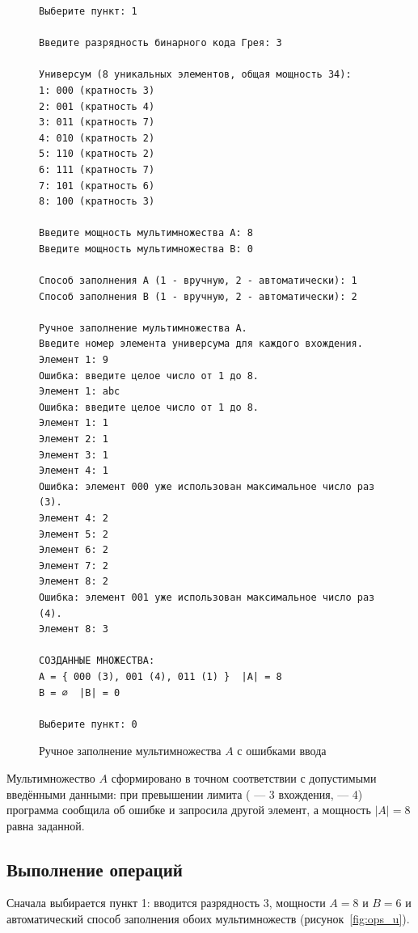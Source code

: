 \documentclass[14pt,a4paper]{extarticle}
\newcommand{\codefont}{\renewcommand{\baselinestretch}{1}\monofont\fontsize{10}{12}\selectfont}
\newcommand{\card}[1]{\left|#1\right|}
\newcommand{\code}[1]{{\monofont #1}}
\begin{document}
\begin{figure}[H]
\begin{Verbatim}[frame=single,framesep=4pt,breaklines=true,formatcom=\codefont]
Выберите пункт: 1

Введите разрядность бинарного кода Грея: 3

Универсум (8 уникальных элементов, общая мощность 34):
1: 000 (кратность 3)
2: 001 (кратность 4)
3: 011 (кратность 7)
4: 010 (кратность 2)
5: 110 (кратность 2)
6: 111 (кратность 7)
7: 101 (кратность 6)
8: 100 (кратность 3)

Введите мощность мультимножества A: 8
Введите мощность мультимножества B: 0

Способ заполнения A (1 - вручную, 2 - автоматически): 1
Способ заполнения B (1 - вручную, 2 - автоматически): 2

Ручное заполнение мультимножества A.
Введите номер элемента универсума для каждого вхождения.
Элемент 1: 9
Ошибка: введите целое число от 1 до 8.
Элемент 1: abc
Ошибка: введите целое число от 1 до 8.
Элемент 1: 1
Элемент 2: 1
Элемент 3: 1
Элемент 4: 1
Ошибка: элемент 000 уже использован максимальное число раз (3).
Элемент 4: 2
Элемент 5: 2
Элемент 6: 2
Элемент 7: 2
Элемент 8: 2
Ошибка: элемент 001 уже использован максимальное число раз (4).
Элемент 8: 3

СОЗДАННЫЕ МНОЖЕСТВА:
A = { 000 (3), 001 (4), 011 (1) }  |A| = 8
B = ∅  |B| = 0

Выберите пункт: 0
\end{Verbatim}
\caption{Ручное заполнение мультимножества $A$ с ошибками ввода}\label{fig:manual}
\end{figure}

Мультимножество $A$ сформировано в точном соответствии с допустимыми введёнными данными: при превышении лимита (\code{000} --- 3 вхождения, \code{001} --- 4) программа сообщила об ошибке и запросила другой элемент, а мощность $\card{A}=8$ равна заданной.

\subsection{Выполнение операций}

Сначала выбирается пункт 1: вводится разрядность 3, мощности $A=8$ и $B=6$ и автоматический способ заполнения обоих мультимножеств (рисунок~\ref{fig:ops_u}).
\end{document}
